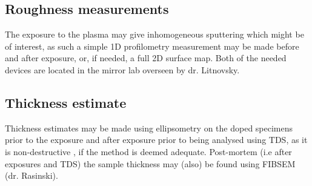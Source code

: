 \documentclass{article}
\begin{document}
\subsection{Roughness measurements}
The exposure to the plasma may give inhomogeneous sputtering which might be
of interest, as such a simple 1D profilometry measurement may be made before
and after exposure, or, if needed, a full 2D surface map. Both of the needed
devices are located in the mirror lab overseen by dr. Litnovsky.
\subsection{Thickness estimate}
Thickness estimates may be made using ellipsometry on the doped specimens 
prior to the exposure and after exposure prior to being analysed using TDS, as it is non-destructive 
, if the method is deemed adequate.
Post-mortem (i.e after exposures and TDS) the sample thickness may (also) 
be found using FIBSEM (dr. Rasinski).


\end{document}
